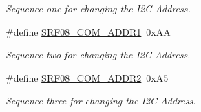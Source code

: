 \begin{DoxyCompactItemize}
\begin{DoxyCompactList}\small\item\em \-Sequence one for changing the \-I2\-C-\/\-Address. \end{DoxyCompactList}\item 
\hypertarget{group___s_r_f08___c_o_m_m_a_n_d_s_gabd43092bfa433d67683d45d5ae80168e}{\#define \hyperlink{group___s_r_f08___c_o_m_m_a_n_d_s_gabd43092bfa433d67683d45d5ae80168e}{\-S\-R\-F08\-\_\-\-C\-O\-M\-\_\-\-A\-D\-D\-R1}~0x\-A\-A}\label{group___s_r_f08___c_o_m_m_a_n_d_s_gabd43092bfa433d67683d45d5ae80168e}

\begin{DoxyCompactList}\small\item\em \-Sequence two for changing the \-I2\-C-\/\-Address. \end{DoxyCompactList}\item 
\hypertarget{group___s_r_f08___c_o_m_m_a_n_d_s_gaf3b62e25ee73df4bb301d63b2ea7d5ca}{\#define \hyperlink{group___s_r_f08___c_o_m_m_a_n_d_s_gaf3b62e25ee73df4bb301d63b2ea7d5ca}{\-S\-R\-F08\-\_\-\-C\-O\-M\-\_\-\-A\-D\-D\-R2}~0x\-A5}\label{group___s_r_f08___c_o_m_m_a_n_d_s_gaf3b62e25ee73df4bb301d63b2ea7d5ca}

\begin{DoxyCompactList}\small\item\em \-Sequence three for changing the \-I2\-C-\/\-Address. \end{DoxyCompactList}\end{DoxyCompactItemize}
